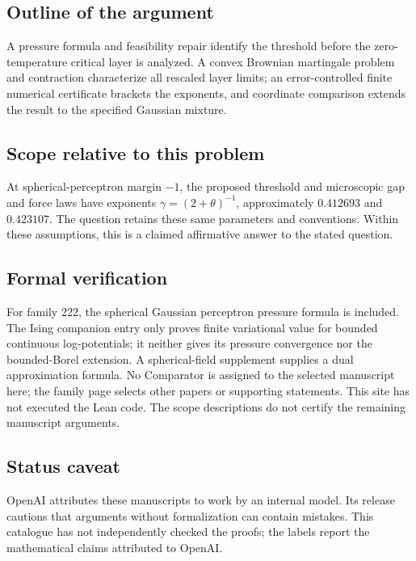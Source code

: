 \documentclass[11pt]{article}
\begin{document}
\subsection{Outline of the argument}
A pressure formula and feasibility repair identify the threshold before the zero-temperature critical layer is analyzed. A convex Brownian martingale problem and contraction characterize all rescaled layer limits; an error-controlled finite numerical certificate brackets the exponents, and coordinate comparison extends the result to the specified Gaussian mixture.

\subsection{Scope relative to this problem}
At spherical-perceptron margin $-1$, the proposed threshold and microscopic gap and force laws have exponents $\gamma=(2+\theta)^{-1}$, approximately $0.412693$ and $0.423107$. The question retains these same parameters and conventions. Within these assumptions, this is a claimed affirmative answer to the stated question.

\subsection{Formal verification}
For family 222, the spherical Gaussian perceptron pressure formula is included. The Ising companion entry only proves finite variational value for bounded continuous log-potentials; it neither gives its pressure convergence nor the bounded-Borel extension. A spherical-field supplement supplies a dual approximation formula. No Comparator is assigned to the selected manuscript here; the family page selects other papers or supporting statements. This site has not executed the Lean code. The scope descriptions do not certify the remaining manuscript arguments.

\subsection{Status caveat}
OpenAI attributes these manuscripts to work by an internal model. Its release cautions that arguments without formalization can contain mistakes. This catalogue has not independently checked the proofs; the labels report the mathematical claims attributed to OpenAI.
\end{document}

